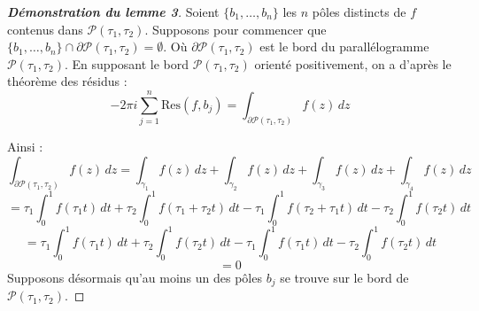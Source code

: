 \documentclass[12pt]{article}
\begin{document}
    \begin{proof}[\textbf{Démonstration du lemme 3}]
    Soient \( \{b_1, \ldots, b_n \} \) les \( n \) pôles distincts de \( f \) contenus dans \( \mathcal{P}(\tau_1, \tau_2) \).
    Supposons pour commencer que \( \{b_1, \ldots, b_n\} \cap \partial \mathcal{P}(\tau_1, \tau_2) = \emptyset \). Où $  \partial \mathcal{P}(\tau_1, \tau_2)$ est le bord du parallélogramme $\mathcal{P}(\tau_1, \tau_2)$.
    En supposant le bord \( \mathcal{P}(\tau_1, \tau_2) \) orienté positivement, on a d'après le théorème des résidus :
    \[
    -2\pi i \sum_{j=1}^n \text{Res}(f, b_j) = \int_{\partial \mathcal{P}(\tau_1,\tau_2)} f(z) \, dz
    \]
    
    \begin{center}
    \end{center}
    
    Ainsi :
    \[
    \int_{\partial \mathcal{P}(\tau_1,\tau_2)} f(z) \, dz = \int_{\gamma_1} f(z) \, dz + \int_{\gamma_2} f(z) \, dz + \int_{\gamma_3} f(z) \, dz + \int_{\gamma_4} f(z) \, dz 
    \]
    \[
    = \tau_1 \int_0^1 f(\tau_1 t) \, dt + \tau_2 \int_0^1 f(\tau_1 + \tau_2 t) \, dt - \tau_1 \int_0^1 f(\tau_2 + \tau_1 t) \, dt - \tau_2 \int_0^1 f(\tau_2 t) \, dt
    \]
    \[
    = \tau_1 \int_0^1 f(\tau_1 t) \, dt + \tau_2 \int_0^1 f(\tau_2 t) \, dt - \tau_1 \int_0^1 f(\tau_1 t) \, dt - \tau_2 \int_0^1 f(\tau_2 t) \, dt
    \]
    \[
    = 0
    \]
    Supposons désormais qu'au moins un des pôles \( b_j \) se trouve sur le bord de \( \mathcal{P}(\tau_1, \tau_2) \).
    

\end{proof}
\end{document}
